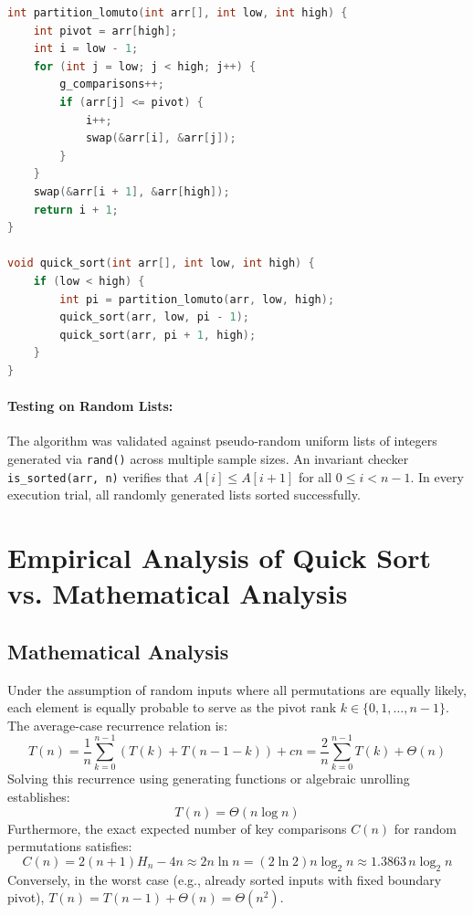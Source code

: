 \documentclass[12pt,a4paper]{article}
\theoremstyle{plain}
\theoremstyle{definition}
\theoremstyle{remark}
\begin{document}
\begin{lstlisting}[language=C, caption={Quick Sort implementation using Lomuto Partitioning (\texttt{quick\_sort.c})}]
int partition_lomuto(int arr[], int low, int high) {
    int pivot = arr[high];
    int i = low - 1;
    for (int j = low; j < high; j++) {
        g_comparisons++;
        if (arr[j] <= pivot) {
            i++;
            swap(&arr[i], &arr[j]);
        }
    }
    swap(&arr[i + 1], &arr[high]);
    return i + 1;
}

void quick_sort(int arr[], int low, int high) {
    if (low < high) {
        int pi = partition_lomuto(arr, low, high);
        quick_sort(arr, low, pi - 1);
        quick_sort(arr, pi + 1, high);
    }
}
\end{lstlisting}

\paragraph{Testing on Random Lists:}
The algorithm was validated against pseudo-random uniform lists of integers generated via \texttt{rand()} across multiple sample sizes. An invariant checker \texttt{is\_sorted(arr, n)} verifies that $A[i] \le A[i+1]$ for all $0 \le i < n-1$. In every execution trial, all randomly generated lists sorted successfully.

\section{Empirical Analysis of Quick Sort vs. Mathematical Analysis}

\subsection{Mathematical Analysis}
Under the assumption of random inputs where all permutations are equally likely, each element is equally probable to serve as the pivot rank $k \in \{0, 1, \dots, n-1\}$. The average-case recurrence relation is:
\begin{equation}
T(n) = \frac{1}{n} \sum_{k=0}^{n-1} \left( T(k) + T(n - 1 - k) \right) + c n = \frac{2}{n} \sum_{k=0}^{n-1} T(k) + \Theta(n)
\end{equation}
Solving this recurrence using generating functions or algebraic unrolling establishes:
\begin{equation}
T(n) = \Theta(n \log n)
\end{equation}
Furthermore, the exact expected number of key comparisons $C(n)$ for random permutations satisfies:
\begin{equation}
C(n) = 2(n+1) H_n - 4n \approx 2 n \ln n = (2 \ln 2) n \log_2 n \approx 1.3863 \, n \log_2 n
\end{equation}
Conversely, in the worst case (e.g., already sorted inputs with fixed boundary pivot), $T(n) = T(n-1) + \Theta(n) = \Theta(n^2)$.
\end{document}
